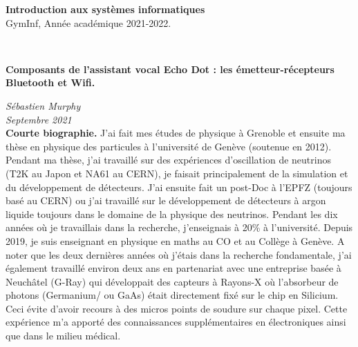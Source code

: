 \documentclass[12pt,svgnames]{article}
\begin{document}


\begin{large}\textcolor{airforceblue}{\textbf{Introduction aux systèmes informatiques} \\
GymInf,  Année académique 2021-2022.}
\end{large}\\
\begin{Large}
\begin{center}
   \textcolor{airforceblue}{\textbf{Composants de l'assistant vocal Echo Dot : les émetteur-récepteurs Bluetooth et Wifi.}}\\[.1cm]
\end{center}
\end{Large}
\textit{Sébastien Murphy}\\
\textit{Septembre 2021}
\\[.2cm]





\textbf{Courte biographie.} J'ai fait mes études de physique à Grenoble et ensuite ma thèse en physique des particules à l'université de Genève (soutenue en 2012). Pendant ma thèse, j'ai travaillé sur des expériences d'oscillation de neutrinos (T2K au Japon et NA61 au CERN), je faisait principalement de la simulation et du développement de détecteurs. J'ai ensuite fait un post-Doc à l'EPFZ (toujours basé au CERN) ou j'ai travaillé sur le développement de détecteurs à argon liquide toujours dans le domaine de la physique des neutrinos. Pendant les dix années où je travaillais dans la recherche, j'enseignais à 20\% à l'université. Depuis 2019, je suis enseignant en physique en maths au CO et au Collège à Genève. A noter que les deux dernières années où j'étais dans la recherche fondamentale, j'ai également travaillé environ deux ans en partenariat avec une entreprise basée à Neuchâtel (G-Ray) qui développait des capteurs à Rayons-X où l'absorbeur de photons (Germanium/ ou GaAs) était directement fixé sur le chip en Silicium. Ceci évite d'avoir recours à des micros points de soudure sur chaque pixel. Cette expérience m'a apporté des connaissances supplémentaires en électroniques ainsi que dans le milieu médical.
\end{document}
